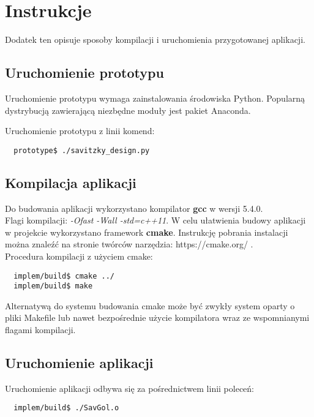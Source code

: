 \section{Instrukcje} \label{sec:how_to}


Dodatek ten opisuje sposoby kompilacji i uruchomienia przygotowanej aplikacji.

\subsection{Uruchomienie prototypu}

Uruchomienie prototypu wymaga zainstalowania środowiska Python.
Popularną dystrybucją zawierającą niezbędne moduły jest pakiet Anaconda.

\noindent Uruchomienie prototypu z linii komend:
\begin{verbatim}
  prototype$ ./savitzky_design.py
\end{verbatim}


\subsection{Kompilacja aplikacji}

Do budowania aplikacji wykorzystano kompilator \textbf{gcc} w wersji 5.4.0.\\
Flagi kompilacji: \textit{-Ofast -Wall -std=c++11}.
W celu ułatwienia budowy aplikacji w projekcie wykorzystano framework \textbf{cmake}. Instrukcję pobrania instalacji można znaleźć
na stronie twórców narzędzia: https://cmake.org/ .\\
\noindent Procedura kompilacji z użyciem cmake:
\begin{verbatim}
  implem/build$ cmake ../
  implem/build$ make
\end{verbatim}


Alternatywą do systemu budowania cmake może być zwykły system oparty o pliki Makefile lub nawet bezpośrednie użycie kompilatora wraz ze wspomnianymi flagami kompilacji.\\

\subsection{Uruchomienie aplikacji}

\noindent Uruchomienie aplikacji odbywa się za pośrednictwem linii poleceń:
\begin{verbatim}
  implem/build$ ./SavGol.o
\end{verbatim}



